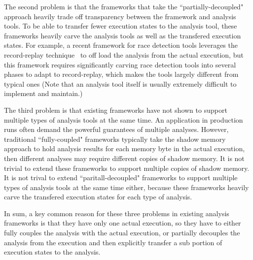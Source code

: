 The second problem is that the frameworks that take the ``partially-decoupled" 
approach heavily trade off transparency between the framework and analysis 
tools. To be able to transfer fewer execution states to the analysis tool, 
these frameworks heavily carve the analysis tools as well as the transfered 
execution states. For example, a recent framework for race detection tools 
leverages the record-replay technique~\cite{scribe:sigmetrics2010, 
respec:asplos10, racepro:sosp11} to off load the analysis from the actual 
execution, but this framework requires significantly carving race detection 
tools into several phases to adapt to record-replay, which makes the tools 
largely different from typical ones (Note that an analysis tool itself is 
usually extremely difficult to implement and maintain.)


The third problem is that existing frameworks have not shown to support 
multiple types of analysis tools at the same time. An application in 
production runs often demand the powerful guarantees of multiple analyses. 
However, traditional ``fully-coupled" frameworks typically take the shadow 
memory approach to hold analysis results for each memory byte in the actual 
execution, then different analyses may require different copies of 
shadow memory. It is not trivial to extend these frameworks to support multiple 
copies of shadow memory. It is not trival to extend ``paritall-decoupled" 
frameworks to support multiple types of analysis tools at the same time either, 
because these frameworks heavily carve the transfered execution states for each 
type of analysis.


In sum, a key common reason for these three problems in existing analysis 
frameworks is that they have only one actual execution, so they have to either 
fully couples the analysis with the actual execution, or partially decouples 
the analysis from the execution and then explicitly transfer a sub portion of 
execution states to the analysis.






